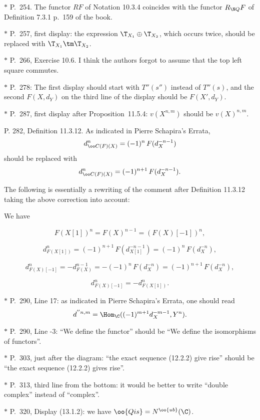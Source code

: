 \documentclass[12pt]{article}
\theoremstyle{remark}
\theoremstyle{definition}
\begin{document}
\nn$*$ P.~254. The functor $RF$ of Notation 10.3.4 coincides with the functor $R_{\N Q}F$ of Definition 7.3.1 p.~159 of the book.

\nn$*$ P.~257, first display: the expression $\T_{X_1}\oplus\T_{X_2}$, which occurs twice, should be replaced with $\T_{X_1}\tm\T_{X_2}$.

\nn$*$ P.~266, Exercise 10.6. I think the authors forgot to assume that the top left square commutes.

\nn$*$ P.~278: The first display should start with $T''(s'')$ instead of $T''(s)$, and the second $F(X,d_Y)$ on the third line of the display should be $F(X',d_Y)$.

\nn$*$ P.~287, first display after Proposition~11.5.4: $v(X^{n,m})$ should be $v(X)^{n,m}$.

\begin{s}
P. 282, Definition 11.3.12. As indicated in Pierre Schapira's Errata, 
$$
d^n_{\oo C(F)(X)}=(-1)^n\,F(d_X^{-n-1})
$$ 
should be replaced with 
$$
d^n_{\oo C(F)(X)}=(-1)^{n+1}\,F(d_X^{-n-1}).
$$ 

The following is essentially a rewriting of the comment after Definition 11.3.12 taking the above correction into account:

We have 

$$F(X[1])^n=F(X)^{n-1}=(F(X)[-1])^n,$$ 

$$d^n_{F(X[1])}=(-1)^{n+1}\,F(d_{X[1]}^{-n-1})=(-1)^n\,F(d_X^{-n}),$$ 

$$d^n_{F(X)[-1]}=-d_{F(X)}^{n-1}=-(-1)^n\,F(d_X^{-n})=(-1)^{n+1}\,F(d_X^{-n}),$$ 

$$d^n_{F(X)[-1]}=-d^n_{F(X[1])}.$$
\end{s}

\begin{s}
\nn$*$ P.~290, Line 17: as indicated in Pierre Schapira's Errata, one should read 
$$
d^{''n,m}=\Hom_\C((-1)^{m+1}d_X^{-m-1},Y^n).
$$
\end{s}

\nn$*$ P.~290, Line -3: ``We define the functor'' should be ``We define the isomorphisms of functors''.

\nn$*$ P.~303, just after the diagram: ``the exact sequence (12.2.2) give rise'' should be ``the exact sequence (12.2.2) gives rise''.

\nn$*$ P.~313, third line from the bottom: it would be better to write ``double complex'' instead of ``complex''.

\nn$*$ P.~320, Display (13.1.2): we have $\oo{Qis}=N^{\oo{ub}}(\C)$.
\end{document}
